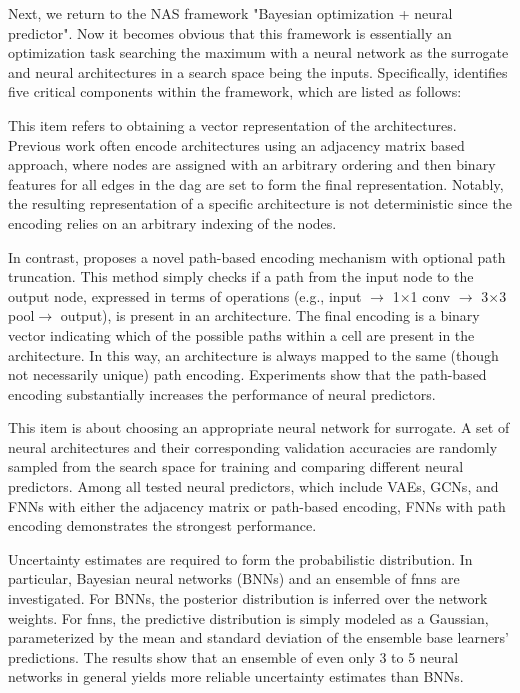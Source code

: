 Next, we return to the NAS framework "Bayesian optimization + neural predictor". Now it becomes obvious that this framework is essentially an optimization task searching the maximum with a neural network as the surrogate and neural architectures in a search space being the inputs. Specifically, \cite{white2019bananas} identifies five critical components within the framework, which are listed as follows:

\begin{description}[leftmargin=0cm, listparindent=\parindent]
	\item [Architecture Encoding] This item refers to obtaining a vector representation of the architectures. Previous work often encode architectures using an adjacency matrix based approach, where nodes are assigned with an arbitrary ordering  and then binary features for all edges in the \gls{dag} are set to form the final representation.	Notably, the resulting representation of a specific architecture is not deterministic since the encoding  relies on an arbitrary indexing of the nodes. 
 
	In contrast, \cite{white2019bananas} proposes a novel path-based encoding mechanism with optional path truncation. This method simply checks if a path from the input node to the output node, expressed in terms of operations (e.g., input $\rightarrow$ 1$\times$1 conv $\rightarrow$ 3$\times$3 pool$\rightarrow$ output), is present in an architecture. The final encoding is a binary vector indicating which of the possible paths within a cell are present in the architecture. In this way, an architecture is always mapped to the same (though not necessarily unique) path encoding. Experiments show that the path-based encoding substantially increases the performance of neural predictors.
	
	\item [Neural Predictor] This item is about choosing an appropriate neural network for surrogate. A set of neural architectures and their corresponding validation accuracies are randomly sampled from the search space for training and comparing different neural predictors. Among all tested neural predictors, which include VAEs, GCNs, and FNNs with either the adjacency matrix or path-based encoding, FNNs with path encoding demonstrates the strongest performance.
	 
	\item [Uncertainty Estimation] Uncertainty estimates are required to form the probabilistic distribution. In particular, 
		Bayesian neural networks (BNNs) and an ensemble of \gls{fnns} are investigated. For BNNs, the posterior distribution is inferred over the network weights. For \gls{fnns}, the predictive distribution is simply modeled as a Gaussian, parameterized by the mean and standard deviation of the ensemble base learners' predictions. The results show that an ensemble of even only 3 to 5 neural networks in general yields more reliable uncertainty estimates than BNNs.
	

\end{description}
